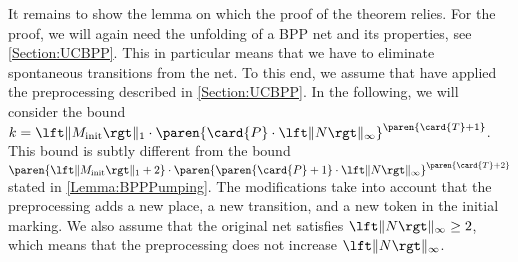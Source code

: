 \documentclass[../../diss.tex]{subfiles}
\begin{document}
It remains to show the lemma on which the proof of the theorem relies.
For the proof, we will again need the unfolding of a BPP net and its properties, see \cref{Section:UCBPP}.
This in particular means that we have to eliminate spontaneous transitions from the net.
To this end, we assume that have applied the preprocessing described in \cref{Section:UCBPP}.
In the following, we will consider the bound $k = \normone{\Minit} \cdot \paren{ \card{P} \cdot \norminf{N}}^{ \paren{\card{T} + 1} }$.
This bound is subtly different from the bound $\paren{\normone{\Minit}+2} \cdot \paren{ \paren{\card{P}+1} \cdot \norminf{N}}^{ \paren{\card{T} + 2} }$ stated in \cref{Lemma:BPPPumping}.
The modifications take into account that the preprocessing adds a new place, a new transition, and a new token in the initial marking.
We also assume that the original net satisfies $\norminf{N} \geq 2$, which means that the preprocessing does not increase $\norminf{N}$.
\end{document}
